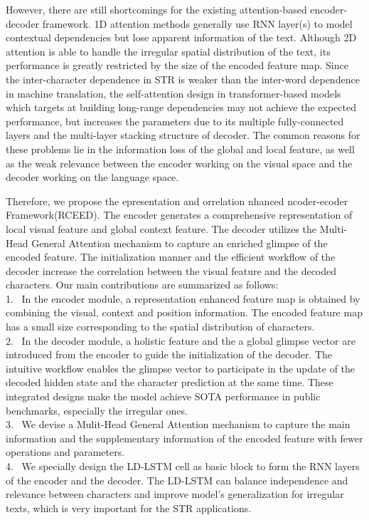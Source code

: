 \documentclass[runningheads]{llncs}
\begin{document}
However, there are still shortcomings for the existing attention-based encoder-decoder framework. 1D attention methods generally use RNN layer(s) to model contextual dependencies but lose apparent information of the text\cite{shi2018aster}. Although 2D attention is able to handle the irregular spatial distribution of the text, its performance is greatly restricted by the size of the encoded feature map\cite{li2019show}. Since the inter-character dependence in STR is weaker than the inter-word dependence in machine translation, the self-attention design in transformer-based models which targets at building long-range dependencies may not achieve the expected performance\cite{yang2020holistic}, but increases the parameters due to its multiple fully-connected layers and the multi-layer stacking structure of decoder. The common reasons for these problems lie in the information loss of the global and local feature, as well as the weak relevance between the encoder working on the visual space and the decoder working on the language space. 

Therefore, we propose the epresentation and orrelation nhanced ncoder-ecoder Framework(RCEED). The encoder generates a comprehensive representation of local visual feature and global context feature. The decoder utilizes the Multi-Head General Attention mechanism to capture an enriched glimpse of the encoded feature. The initialization manner and the efficient workflow of the decoder increase the correlation between the visual feature and the decoded characters.  
Our main contributions are summarized as follows:
\\ 1. \ In the encoder module, a representation enhanced feature map is obtained by combining the visual, context and position information. The encoded feature map has a small size corresponding to the spatial distribution of characters. 
\\ 2. \ In the decoder module, a holistic feature and the a global glimpse vector are introduced from the encoder to guide the initialization of the decoder. The intuitive workflow enables the glimpse vector to participate in the update of the decoded hidden state and the character prediction at the same time. These integrated designs make the model achieve SOTA performance in public benchmarks, especially the irregular ones.
\\ 3. \ We devise a Mulit-Head General Attention mechanism to capture the main information and the supplementary information of the encoded feature with fewer operations and parameters.
\\ 4. \  We specially design the LD-LSTM cell as basic block to form the RNN layers of the encoder and the decoder. The LD-LSTM can balance independence and relevance between characters and improve model's generalization for irregular texts, which is very important for the STR applications. 
\end{document}

